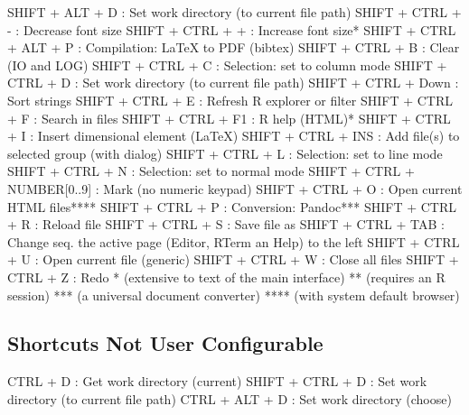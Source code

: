 \begin{Rtables}[caption={[SHIFT + keyboard shortcuts]
    SHIFT + keyboard shortcuts},
  label=shortcut:shiftplus]
  SHIFT + ALT  + D            : Set work directory (to current file path)
  SHIFT + CTRL + -            : Decrease font size
  SHIFT + CTRL + +            : Increase font size*
  SHIFT + CTRL + ALT + P      : Compilation: LaTeX to PDF (bibtex)
  SHIFT + CTRL + B            : Clear (IO and LOG)
  SHIFT + CTRL + C            : Selection: set to column mode
  SHIFT + CTRL + D            : Set work directory (to current file path)
  SHIFT + CTRL + Down         : Sort strings
  SHIFT + CTRL + E            : Refresh R explorer or filter
  SHIFT + CTRL + F            : Search in files
  SHIFT + CTRL + F1           : R help (HTML)*
  SHIFT + CTRL + I            : Insert dimensional element (LaTeX)
  SHIFT + CTRL + INS          : Add file(s) to selected group (with dialog)
  SHIFT + CTRL + L            : Selection: set to line mode
  SHIFT + CTRL + N            : Selection: set to normal mode
  SHIFT + CTRL + NUMBER[0..9] : Mark (no numeric keypad)
  SHIFT + CTRL + O            : Open current HTML files****
  SHIFT + CTRL + P            : Conversion: Pandoc***
  SHIFT + CTRL + R            : Reload file
  SHIFT + CTRL + S            : Save file as
  SHIFT + CTRL + TAB          : Change seq. the active page (Editor, RTerm an Help) to the left
  SHIFT + CTRL + U            : Open current file (generic)
  SHIFT + CTRL + W            : Close all files
  SHIFT + CTRL + Z            : Redo
  *    (extensive to text of the main interface)
  **   (requires an R session)
  ***  (a universal document converter)
  **** (with system default browser)
\end{Rtables}

\newpage
\subsection{Shortcuts Not User Configurable}

\vspace{-0.5cm}

  CTRL  + D           : Get work directory (current)
  SHIFT + CTRL + D    : Set work directory (to current file path)
  CTRL  + ALT  + D    : Set work directory (choose)
